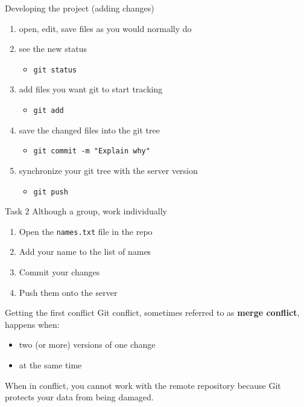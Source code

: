 \documentclass[14pt]{beamer}
\begin{document}
	\begin{frame}{Developing the project (adding changes)}
		\begin{enumerate}
		\item open, edit, save files as you would normally do
		\item see the new status
	        \begin{itemize}
		    \item \texttt{git status}
	        \end{itemize}
		\item add files you want git to start tracking
	        \begin{itemize}
		    \item \texttt{git add}
	        \end{itemize}
		\item save the changed files into the git tree
	        \begin{itemize}
		    \item \texttt{git commit -m "Explain why"}
	        \end{itemize}
		\item synchronize your git tree with the server version
	        \begin{itemize}
		    \item \texttt{git push}
	        \end{itemize}
		\end{enumerate}
	\end{frame}

	\begin{frame}{Task 2}
	Although a group, work individually
	
	\vspace{5pt}

	    \begin{enumerate}
		\item Open the \texttt{names.txt} file in the repo
		\item Add your name to the list of names
		\item Commit your changes
		\item Push them onto the server
	    \end{enumerate}
	\end{frame}

	\begin{frame}{Getting the first conflict}
	Git conflict, sometimes referred to as \textbf{merge conflict}, happens when:
	
	\vspace{5pt}
	
	\begin{itemize}
		\item two (or more) versions of one change
		\item at the same time
	\end{itemize}

	\vspace{5pt}
	
	When in conflict, you cannot work with the remote repository because Git protects your data from being damaged.

\end{frame}
\end{document}
